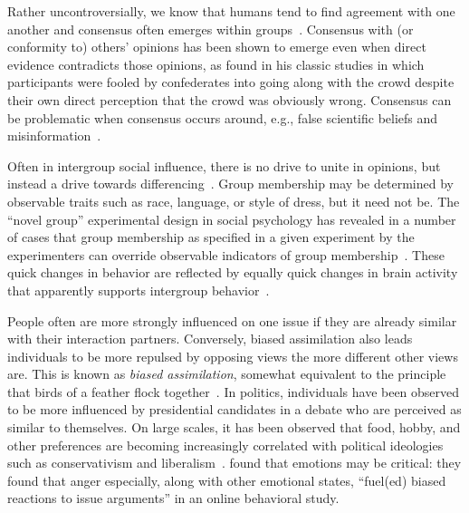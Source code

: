 \documentclass[12pt,letterpaper]{article}
\begin{document}
Rather uncontroversially, we know that humans tend to find agreement with
one another and consensus often 
emerges within groups~\cite{Festinger1954,Cartwright1956,French1956}. 
Consensus with (or conformity to) others' opinions has been shown to emerge 
even when direct evidence contradicts those opinions, as 
found in his classic studies in which participants were fooled by confederates
into going along with the crowd despite their own direct perception that
the crowd was obviously wrong. Consensus can be problematic when
consensus occurs around, e.g., 
false scientific beliefs and 
misinformation~\cite{Zollman2007,Zollman2013,OConnor2018,OConnor2019e}.

Often in intergroup social influence, there is no drive to unite in
opinions, but instead a drive towards differencing~\cite{Tajfel1979,Sherif1988,Flache2011}. 
Group membership may be determined by observable traits such as race, language,
or style of dress, but it need not be. The ``novel group'' experimental design in
social psychology has revealed in a number of cases that group membership
as specified in a given experiment by the experimenters can override observable
indicators of group membership~\cite{Tajfel1971,Billig1973,Tajfel1982}.
These quick changes in behavior are reflected by equally quick changes in 
brain activity that apparently supports intergroup 
behavior~\cite{Cikara2014,Cikara2017}.

People often are more strongly influenced on one issue if they are already
similar with their interaction partners. Conversely, biased assimilation
also leads individuals to be more repulsed by opposing views the more 
different other views are. This is
known as \emph{biased assimilation}, somewhat equivalent to 
the principle that birds of a feather flock together~\cite{Lord1979,McPherson2001}.
In politics, individuals have been observed to be more influenced by presidential
candidates in a debate who are perceived as similar to themselves.
On large scales, it has been observed that food, hobby, and other
preferences are becoming increasingly correlated with political ideologies such
as conservativism and liberalism~\cite{DellaPosta2015}.
 found that emotions may be critical: they found that
anger especially, along with other emotional states, ``fuel(ed) biased reactions
to issue arguments'' in an online behavioral study. 
\end{document}
